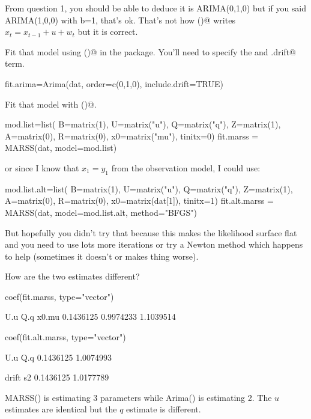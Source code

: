 \begin{wideitemize}
\smallskip
From question 1, you should be able to deduce it is ARIMA(0,1,0) but if you said ARIMA(1,0,0) with b=1, that's ok.  That's not how \verb@Arima()@ writes $x_t = x_{t-1} + u + w_t$ but it is correct.
\item Fit that model using \verb@Arima()@ in the \verb@forecast@ package.  You'll need to specify the \verb@order@ and \verb@include.drift@ term.  
\begin{Schunk}
\begin{Sinput}
 fit.arima=Arima(dat, order=c(0,1,0), include.drift=TRUE)
\end{Sinput}
\end{Schunk}
\item Fit that model with \verb@MARSS()@.
\begin{Schunk}
\begin{Sinput}
 mod.list=list(
   B=matrix(1), U=matrix("u"), Q=matrix("q"),
   Z=matrix(1), A=matrix(0), R=matrix(0),
   x0=matrix("mu"), tinitx=0)
 fit.marss = MARSS(dat, model=mod.list)
\end{Sinput}
\end{Schunk}
or since I know that $x_1 = y_1$ from the observation model, I could use:
\begin{Schunk}
\begin{Sinput}
 mod.list.alt=list(
   B=matrix(1), U=matrix("u"), Q=matrix("q"),
   Z=matrix(1), A=matrix(0), R=matrix(0),
   x0=matrix(dat[1]), tinitx=1)
 fit.alt.marss = MARSS(dat, model=mod.list.alt, method="BFGS")
\end{Sinput}
\end{Schunk}
But hopefully you didn't try that because this makes the likelihood surface flat and you need to use lots more iterations or try a Newton method which happens to help (sometimes it doesn't or makes thing worse).
\item How are the two estimates different?
\begin{Schunk}
\begin{Sinput}
 coef(fit.marss, type="vector")
\end{Sinput}
\begin{Soutput}
      U.u       Q.q     x0.mu 
0.1436125 0.9974233 1.1039514 
\end{Soutput}
\begin{Sinput}
 coef(fit.alt.marss, type="vector")
\end{Sinput}
\begin{Soutput}
      U.u       Q.q 
0.1436125 1.0074993 
\end{Soutput}
\begin{Soutput}
    drift        s2 
0.1436125 1.0177789 
\end{Soutput}
\end{Schunk}
MARSS() is estimating 3 parameters while Arima() is estimating 2.  The $u$ estimates are identical but the $q$ estimate is different.


\end{wideitemize}
